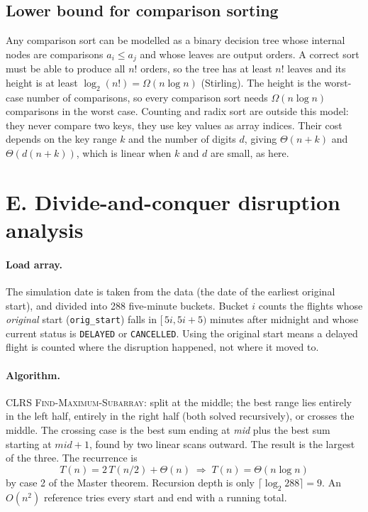 \documentclass[11pt]{article}
\begin{document}
\subsection{Lower bound for comparison sorting}
Any comparison sort can be modelled as a binary decision tree whose internal
nodes are comparisons $a_i \le a_j$ and whose leaves are output orders. A
correct sort must be able to produce all $n!$ orders, so the tree has at least
$n!$ leaves and its height is at least $\log_2(n!) = \Omega(n \log n)$
(Stirling). The height is the worst-case number of comparisons, so every
comparison sort needs $\Omega(n \log n)$ comparisons in the worst case.
Counting and radix sort are outside this model: they never compare two keys,
they use key values as array indices. Their cost depends on the key range $k$
and the number of digits $d$, giving $\Theta(n + k)$ and $\Theta(d(n+k))$,
which is linear when $k$ and $d$ are small, as here.

\section{E. Divide-and-conquer disruption analysis}

\paragraph{Load array.}
The simulation date is taken from the data (the date of the earliest original
start), and divided into 288 five-minute buckets. Bucket $i$ counts the flights
whose \emph{original} start (\texttt{orig\_start}) falls in
$[\,5i, 5i+5)$ minutes after midnight and whose current status is
\texttt{DELAYED} or \texttt{CANCELLED}. Using the original start means a delayed
flight is counted where the disruption happened, not where it moved to.

\paragraph{Algorithm.}
CLRS \textsc{Find-Maximum-Subarray}: split at the middle; the best range lies
entirely in the left half, entirely in the right half (both solved
recursively), or crosses the middle. The crossing case is the best sum ending
at \textit{mid} plus the best sum starting at $\textit{mid}+1$, found by two
linear scans outward. The result is the largest of the three. The recurrence is
\[
T(n) = 2\,T(n/2) + \Theta(n) \;\Rightarrow\; T(n) = \Theta(n \log n)
\]
by case 2 of the Master theorem. Recursion depth is only $\lceil\log_2 288\rceil = 9$.
An $O(n^2)$ reference tries every start and end with a running total.
\end{document}

